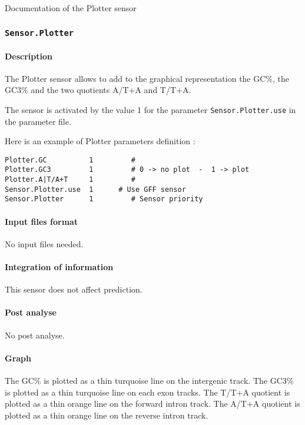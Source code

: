  Documentation of the Plotter sensor

\subsubsection{\texttt{Sensor.Plotter}}

\paragraph{Description}

The Plotter sensor allows to add to the graphical representation the GC\%,
the GC3\% and the two quotients A/T+A and T/T+A.

The sensor is activated by the value 1 for the parameter
\texttt{Sensor.Plotter.use} in the parameter file.

Here is an example of Plotter parameters definition :
\begin{Verbatim}[fontsize=\small]
Plotter.GC          1         #
Plotter.GC3         1         # 0 -> no plot  -  1 -> plot
Plotter.A|T/A+T     1         #
Sensor.Plotter.use  1      # Use GFF sensor
Sensor.Plotter      1         # Sensor priority
\end{Verbatim}

\paragraph{Input files format}

No input files  needed.

\paragraph{Integration of information}

This sensor does not affect prediction.

\paragraph{Post analyse}

No post analyse.

\paragraph{Graph}

The GC\% is plotted as a thin turquoise line on the intergenic track.
The GC3\% is plotted as a thin turquoise line on each exon tracks.
The T/T+A quotient is plotted as a thin orange line on the forward intron
track.
The A/T+A quotient is plotted as a thin orange line on the reverse intron
track.

